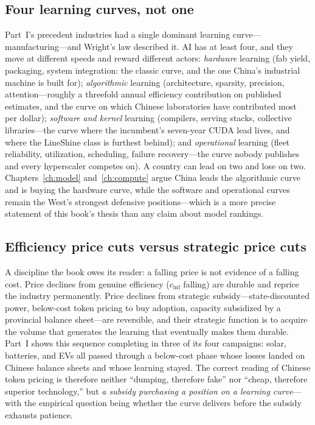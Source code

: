 \subsection{Four learning curves, not one}

Part~I's precedent industries had a single dominant learning curve---manufacturing---and Wright's law described it. AI has at least four, and they move at different speeds and reward different actors: \emph{hardware} learning (fab yield, packaging, system integration: the classic curve, and the one China's industrial machine is built for); \emph{algorithmic} learning (architecture, sparsity, precision, attention---roughly a threefold annual efficiency contribution on published estimates, and the curve on which Chinese laboratories have contributed most per dollar); \emph{software and kernel} learning (compilers, serving stacks, collective libraries---the curve where the incumbent's seven-year CUDA lead lives, and where the LineShine class is furthest behind); and \emph{operational} learning (fleet reliability, utilization, scheduling, failure recovery---the curve nobody publishes and every hyperscaler competes on). A country can lead on two and lose on two. Chapters~\ref{ch:model} and~\ref{ch:compute} argue China leads the algorithmic curve and is buying the hardware curve, while the software and operational curves remain the West's strongest defensive positions---which is a more precise statement of this book's thesis than any claim about model rankings.

\subsection{Efficiency price cuts versus strategic price cuts}

A discipline the book owes its reader: a falling price is not evidence of a falling cost. Price declines from genuine efficiency ($c_{\text{inf}}$ falling) are durable and reprice the industry permanently. Price declines from strategic subsidy---state-discounted power, below-cost token pricing to buy adoption, capacity subsidized by a provincial balance sheet---are reversible, and their strategic function is to acquire the volume that generates the learning that eventually makes them durable. Part~I shows this sequence completing in three of its four campaigns: solar, batteries, and EVs all passed through a below-cost phase whose losses landed on Chinese balance sheets and whose learning stayed. The correct reading of Chinese token pricing is therefore neither ``dumping, therefore fake'' nor ``cheap, therefore superior technology,'' but \emph{a subsidy purchasing a position on a learning curve}---with the empirical question being whether the curve delivers before the subsidy exhausts patience.


